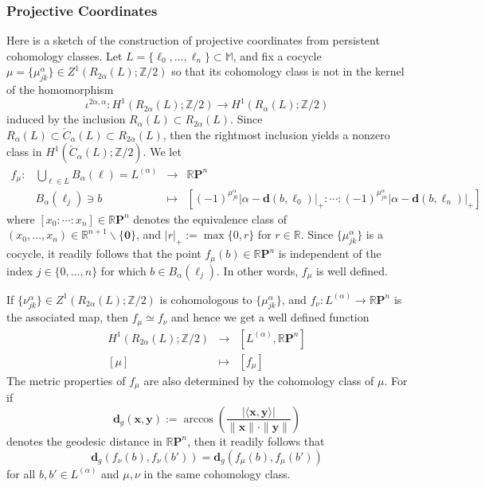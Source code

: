 \documentclass[11pt]{article}
\theoremstyle{definition}
\theoremstyle{remark}
\newcommand{\RR}{\mathbb{R}}
\newcommand{\ZZ}{\mathbb{Z}}
\newcommand{\MM}{\mathbb{M}}
\newcommand{\RP}{\mathbb{R}\mathbf{P}}
\begin{document}
    \subsubsection{Projective Coordinates}
    \label{sec:projcoords}
    Here is a sketch of the construction of projective coordinates from persistent cohomology classes.
    Let $L = \{\ell_0, \ldots, \ell_n\} \subset \MM$,   and fix a cocycle
     $\mu=\{\mu^\alpha_{jk} \} \in Z^1(R_{2\alpha}(L); \ZZ/2)$
    so that its cohomology
    class is not in the kernel of the homomorphism
    \[
    \iota^{2\alpha, \alpha}:
    H^1(R_{2\alpha}(L);\ZZ/2) \longrightarrow H^1(R_\alpha(L);\ZZ/2)
    \]
    induced by the inclusion $R_\alpha(L) \subset R_{2\alpha}(L)$.
    Since $R_\alpha(L) \subset \check{C}_\alpha(L) \subset R_{2\alpha}(L)$,
    then the rightmost inclusion yields a nonzero class in
    $H^1(\check{C}_\alpha(L);\ZZ/2)$.
    We let
    \[
    \begin{array}{cccl}
      f_\mu : & \bigcup\limits_{\ell \in L} B_\alpha(\ell) = L^{(\alpha)} & \longrightarrow  & \RP^n \\
       & B_{\alpha}(\ell_j) \ni b & \mapsto &
       \left[
       (-1)^{\mu_{j0}^\alpha}|\alpha - \mathbf{d}(b, \ell_0)|_{+}
       : \cdots :
       (-1)^{\mu_{jn}^\alpha}|\alpha - \mathbf{d}(b, \ell_n)|_{+}
       \right]
    \end{array}
    \]
    where $[x_0 : \cdots : x_n] \in \RP^n$ denotes the equivalence class of $(x_0,\ldots, x_n)\in \RR^{n+1}\smallsetminus \{\mathbf{0}\}$,
    and $|r|_{+}:= \max\{0,r\}$ for $r\in \RR$.
    Since $\{\mu_{jk}^\alpha\}$ is a cocycle,
    it readily follows that the point
    $f_\mu(b)\in \RP^n$ is independent of the index
    $j\in \{0,\ldots, n\}$ for which $b \in B_{\alpha}(\ell_j)$.
    In other words, $f_\mu$ is well defined.

    If $\{\nu^\alpha_{jk}\}\in Z^1(R_{2\alpha}(L) ;\ZZ/2)$
    is cohomologous to $\{\mu_{jk}^\alpha\}$,
    and $f_\nu : L^{(\alpha)} \longrightarrow \RP^n$ is the associated map,
    then
    $f_\mu \simeq f_\nu$
    and hence we get a well defined
    function
    \[
    \begin{array}{ccl}
    H^1(R_{2\alpha}(L) ; \ZZ/2 ) & \longrightarrow &\left[L^{(\alpha)}, \RP^n\right]  \\
    \left[\mu\right]&  \mapsto & [f_\mu]
    \end{array}
    \]
    The metric properties of  $f_\mu$ are also
     determined by the cohomology
    class of $\mu$.
    For if  
    \[
    \mathbf{d}_g(\mathbf{x}, \mathbf{y}) :=
    \arccos
    \left(\frac{
    |\langle \mathbf{x}, \mathbf{y} \rangle|
    }
    {\|\mathbf{x}\|\cdot \|\mathbf{y}\|}\right)
    \]
    denotes the geodesic distance in $\RP^n$,
     then it readily follows that
    \[
    \mathbf{d}_g\left(f_\nu(b), f_\nu(b')\right)
    =
    \mathbf{d}_g\left(f_\mu(b), f_\mu(b')\right)
    \]
    for all $b,b'\in L^{(\alpha)}$ and $\mu, \nu$ in the same cohomology class.
\end{document}
